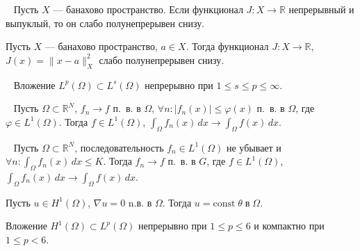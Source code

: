 \begin{lemma}
    \label{lem:weakly_semicontinuous_functional}~\cite[с. 47]{Troeltzsch2010}
    Пусть $X$ — банахово пространство.
    Если функционал $J : X \to \mathbb{R}$ непрерывный и выпуклый,
    то он слабо полунепрерывен снизу.
\end{lemma}

\begin{corollary}
    \label{cor:weakly_semicontinuous_norm}
    Пусть $X$ — банахово пространство, $a \in X$.
    Тогда функционал $J : X \to \mathbb{R}$, $J(x) = \|x - a\|^2_X$
    слабо полунепрерывен снизу.
\end{corollary}

\begin{lemma}
    \label{lem:embedding_Lp_Ls}~\cite[с. 37]{Zeidler1990a}
    Вложение $L^p(\Omega) \subset L^s(\Omega)$ непрерывно при
    $1 \leq s \leq p \leq \infty$.
\end{lemma}

\begin{theorem}[Лебег]
    \label{th:lebeg}~\cite[321]{Kolmogorov2004}
    Пусть $\Omega \subset \mathbb{R}^N$, $f_n \to f$ п.\ в. в $\Omega$,
    $\forall n : |f_n(x)| \leq \varphi(x)$ п.\ в. в $\Omega$,
    где $\varphi \in L^1(\Omega)$.
    Тогда $f \in L^1(\Omega)$, $\int_{\Omega} f_n(x) \, dx \to \int_{\Omega} f(x) \, dx$.
\end{theorem}

\begin{theorem}[Леви]
    \label{th:levi}~\cite[322]{Kolmogorov2004}
    Пусть $\Omega \subset \mathbb{R}^N$, последовательность $f_n \in L^1(\Omega)$
    не убывает и $\forall n : \int_{\Omega} f_n(x) \, dx \leq K$.
    Тогда $f_n \to f$ п.\ в. в $G$, где $f \in L^1(\Omega)$,
    $\int_{\Omega} f_n(x) \, dx \to \int_{\Omega} f(x) \, dx$.
\end{theorem}

\begin{lemma}
    \label{lm:1_7:15}\cite[47]{Ziemer1989}
    Пусть $u \in H^{1}(\Omega)$, $\nabla u = 0$ n.в. в $\Omega$.
    Тогда $u = \text{const} \; \theta \; \text{в} \; \Omega$.
\end{lemma}

\begin{lemma}
    \label{lm:1_7:embedding}\cite[1026]{Zeidler1990b}
    Вложение $H^{1}(\Omega) \subset L^{p}(\Omega)$ непрерывно
    при $1 \leq p \leq 6$ и компактно при $1 \leq p<6$.
\end{lemma}


